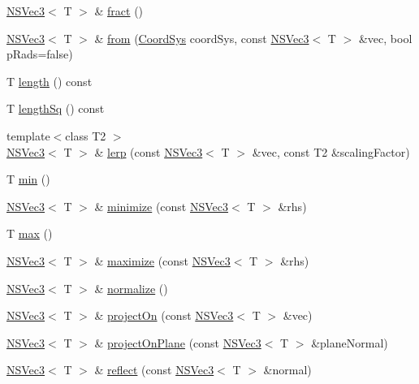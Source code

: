 \begin{DoxyCompactItemize}
\hyperlink{structNSVec3}{N\-S\-Vec3}$<$ T $>$ \& \hyperlink{structNSVec3_a78cb72f720acab6b05408a33c91db361}{fract} ()
\item 
\hyperlink{structNSVec3}{N\-S\-Vec3}$<$ T $>$ \& \hyperlink{structNSVec3_a171aab63ff0fcc32a8a183d3bb7f97c7}{from} (\hyperlink{structNSVec3_a79e942f48c6360d21b4e167c1ea890e2}{Coord\-Sys} coord\-Sys, const \hyperlink{structNSVec3}{N\-S\-Vec3}$<$ T $>$ \&vec, bool p\-Rads=false)
\item 
T \hyperlink{structNSVec3_ad23e85d71c370185ca0ad24a4b7beed8}{length} () const 
\item 
T \hyperlink{structNSVec3_aefef957f4dd64bc35afc915815c783c8}{length\-Sq} () const 
\item 
{\footnotesize template$<$class T2 $>$ }\\\hyperlink{structNSVec3}{N\-S\-Vec3}$<$ T $>$ \& \hyperlink{structNSVec3_a462c042d881fb7e998866b757e881751}{lerp} (const \hyperlink{structNSVec3}{N\-S\-Vec3}$<$ T $>$ \&vec, const T2 \&scaling\-Factor)
\item 
T \hyperlink{structNSVec3_a4abde3a564d1c15252ac74b1dd6efe6e}{min} ()
\item 
\hyperlink{structNSVec3}{N\-S\-Vec3}$<$ T $>$ \& \hyperlink{structNSVec3_a2cc9ce9d14e42f8b9024397fae580d0f}{minimize} (const \hyperlink{structNSVec3}{N\-S\-Vec3}$<$ T $>$ \&rhs)
\item 
T \hyperlink{structNSVec3_a63b923b7af3dd11e4b7f0d027f35d076}{max} ()
\item 
\hyperlink{structNSVec3}{N\-S\-Vec3}$<$ T $>$ \& \hyperlink{structNSVec3_ae4fd977258addfb7e51716a3f299e5fd}{maximize} (const \hyperlink{structNSVec3}{N\-S\-Vec3}$<$ T $>$ \&rhs)
\item 
\hyperlink{structNSVec3}{N\-S\-Vec3}$<$ T $>$ \& \hyperlink{structNSVec3_acbdd599458d75c3fd9b1767882b165cd}{normalize} ()
\item 
\hyperlink{structNSVec3}{N\-S\-Vec3}$<$ T $>$ \& \hyperlink{structNSVec3_a020433517144faf15e557934a9ca3caa}{project\-On} (const \hyperlink{structNSVec3}{N\-S\-Vec3}$<$ T $>$ \&vec)
\item 
\hyperlink{structNSVec3}{N\-S\-Vec3}$<$ T $>$ \& \hyperlink{structNSVec3_ad45d75f9f9226ab7a30c7d80d2e01417}{project\-On\-Plane} (const \hyperlink{structNSVec3}{N\-S\-Vec3}$<$ T $>$ \&plane\-Normal)
\item 
\hyperlink{structNSVec3}{N\-S\-Vec3}$<$ T $>$ \& \hyperlink{structNSVec3_a8bdadfb020e252f5f317ec530120dc68}{reflect} (const \hyperlink{structNSVec3}{N\-S\-Vec3}$<$ T $>$ \&normal)
\item 

\end{DoxyCompactItemize}
